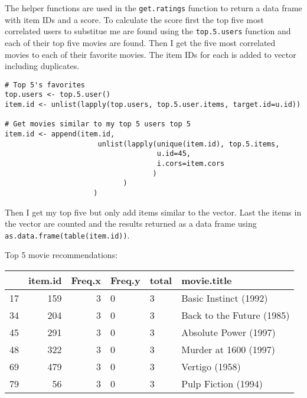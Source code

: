 \documentclass[12pt, a4paper]{article}
\newcommand{\code}[1]{\texttt{#1}}
\begin{document}
\newpage
The helper functions are used in the \code{get.ratings} function to return a data frame with item IDs and a score. To calculate the score first the top five most correlated users to substitue me are found using the \code{top.5.users} function and each of their top five movies are found. Then I get the five most correlated movies to each of their favorite movies. The item IDs for each is added to vector including duplicates.

\begin{minipage}{\linewidth} %
\vspace{2em}
\begin{verbatim}
# Top 5's favorites
top.users <- top.5.user()
item.id <- unlist(lapply(top.users, top.5.user.items, target.id=u.id))

# Get movies similar to my top 5 users top 5
item.id <- append(item.id,
                      unlist(lapply(unique(item.id), top.5.items, 
                                    u.id=45, 
                                    i.cors=item.cors
                                   )
                            )
                     )
\end{verbatim}
\vspace{2em}
\end{minipage}
    
Then I get my top five but only add items similar to the vector. Last the items in the vector are counted and the results returned as a data frame using \code{as.data.frame(table(item.id))}.

\newpage
Top 5 movie recommendations:

\begin{minipage}{\linewidth} %
\vspace{2em}
\centering
\begin{tabular}{|l|r|r|l|l|l|}
    \hline
      & item.id & Freq.x & Freq.y & total & movie.title\\
    \hline
    17 & 159 & 3 & 0 & 3 & Basic Instinct (1992)\\
    \hline
    34 & 204 & 3 & 0 & 3 & Back to the Future (1985)\\
    \hline
    45 & 291 & 3 & 0 & 3 & Absolute Power (1997)\\
    \hline
    48 & 322 & 3 & 0 & 3 & Murder at 1600 (1997)\\
    \hline
    69 & 479 & 3 & 0 & 3 & Vertigo (1958)\\
    \hline
    79 & 56 & 3 & 0 & 3 & Pulp Fiction (1994)\\
    \hline
\end{tabular}
\vspace{2em}
\end{minipage}
\end{document}
